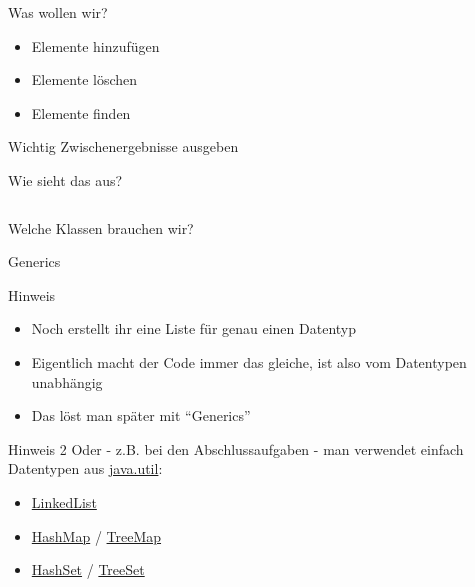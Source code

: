 \documentclass[usepdftitle=false,hyperref={pdfpagelabels=false}]{beamer}
\begin{document}

\begin{frame}{Was wollen wir?}
    \begin{itemize}[<+->]
        \item Elemente hinzufügen
        \item Elemente löschen
        \item Elemente finden
    \end{itemize}

    \pause[\thebeamerpauses]
    \begin{alertblock}{Wichtig}
        Zwischenergebnisse ausgeben
    \end{alertblock}
\end{frame}

\begin{frame}{Wie sieht das aus?}
    \inputminted[linenos=false, numbersep=5pt, tabsize=4, fontsize=\tiny, label=Main.java, frame=lines]{java}{Main.java}
\end{frame}

\begin{frame}{Welche Klassen brauchen wir?}
\end{frame}

\begin{frame}{Generics}
  \begin{block}{Hinweis}
    \begin{itemize}[<+->]
        \item Noch erstellt ihr eine Liste für genau einen Datentyp
        \item Eigentlich macht der Code immer das gleiche, ist also
              vom Datentypen unabhängig
        \item Das löst man später mit "`Generics"'
    \end{itemize}
  \end{block}

  \pause[\thebeamerpauses]
  \begin{block}{Hinweis 2}
    Oder - z.B. bei den Abschlussaufgaben - man verwendet einfach Datentypen
    aus \href{http://docs.oracle.com/javase/7/docs/api/java/util/package-summary.html}{java.util}:
    \begin{itemize}[<+->]
        \item \href{http://docs.oracle.com/javase/7/docs/api/java/util/LinkedList.html}{LinkedList}
        \item \href{http://docs.oracle.com/javase/7/docs/api/java/util/HashMap.html}{HashMap} /
              \href{http://docs.oracle.com/javase/7/docs/api/java/util/TreeMap.html}{TreeMap}
        \item \href{http://docs.oracle.com/javase/7/docs/api/java/util/HashSet.html}{HashSet} /
              \href{http://docs.oracle.com/javase/7/docs/api/java/util/TreeSet.html}{TreeSet}
    \end{itemize}
  \end{block}
\end{frame}
\end{document}
